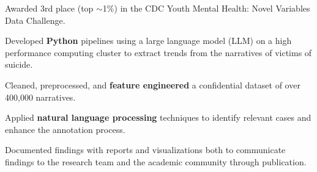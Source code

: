 \begin{bullets}
	\item Awarded 3rd place (top $\sim$1\%) in the CDC Youth Mental Health: Novel Variables Data Challenge.
	\item Developed \textbf{Python} pipelines using a large language model (LLM) on a high performance computing cluster to extract trends from the narratives of victims of suicide.
	\item Cleaned, preprocessed, and \textbf{feature engineered} a confidential dataset of over 400,000 narratives.
	\item Applied \textbf{natural language processing} techniques to identify relevant cases and enhance the annotation process.
	\item Documented findings with reports and visualizations both to communicate findings to the research team and the academic community through publication.
\end{bullets}